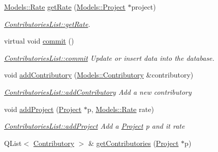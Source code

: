 \begin{DoxyCompactItemize}
\hyperlink{classModels_1_1Rate}{Models\+::\+Rate} \hyperlink{classModels_1_1ContributoriesList_a16118d05867f3e2550f44796400253b9}{get\+Rate} (\hyperlink{classModels_1_1Project}{Models\+::\+Project} $\ast$project)
\begin{DoxyCompactList}\small\item\em \hyperlink{classModels_1_1ContributoriesList_a16118d05867f3e2550f44796400253b9}{Contributories\+List\+::get\+Rate}. \end{DoxyCompactList}\item 
\hypertarget{classModels_1_1ContributoriesList_ad341e0527f4c9057281400f6cf54e54f}{}virtual void \hyperlink{classModels_1_1ContributoriesList_ad341e0527f4c9057281400f6cf54e54f}{commit} ()\label{classModels_1_1ContributoriesList_ad341e0527f4c9057281400f6cf54e54f}

\begin{DoxyCompactList}\small\item\em \hyperlink{classModels_1_1ContributoriesList_ad341e0527f4c9057281400f6cf54e54f}{Contributories\+List\+::commit} Update or insert data into the database. \end{DoxyCompactList}\item 
void \hyperlink{classModels_1_1ContributoriesList_a62b01d5292326da5902589ddb9b71234}{add\+Contributory} (\hyperlink{classModels_1_1Contributory}{Models\+::\+Contributory} \&contributory)
\begin{DoxyCompactList}\small\item\em \hyperlink{classModels_1_1ContributoriesList_a62b01d5292326da5902589ddb9b71234}{Contributories\+List\+::add\+Contributory} Add a new {\itshape contributory} \end{DoxyCompactList}\item 
void \hyperlink{classModels_1_1ContributoriesList_a4c99c890fc7d7616678d6e5f7ee558f5}{add\+Project} (\hyperlink{classModels_1_1Project}{Project} $\ast$p, \hyperlink{classModels_1_1Rate}{Models\+::\+Rate} rate)
\begin{DoxyCompactList}\small\item\em \hyperlink{classModels_1_1ContributoriesList_a4c99c890fc7d7616678d6e5f7ee558f5}{Contributories\+List\+::add\+Project} Add a \hyperlink{classModels_1_1Project}{Project} {\itshape p} and it {\itshape rate} \end{DoxyCompactList}\item 
Q\+List$<$ \hyperlink{classModels_1_1Contributory}{Contributory} $>$ \& \hyperlink{classModels_1_1ContributoriesList_a2549547fd3866d879ebbfd1f38145fc5}{get\+Contributories} (\hyperlink{classModels_1_1Project}{Project} $\ast$p)

\end{DoxyCompactItemize}
